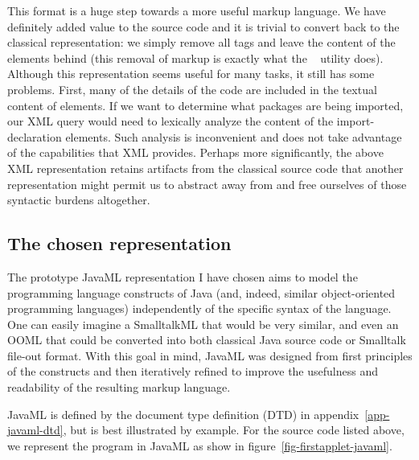 \documentclass{article}
\begin{document}
This format is a huge step towards a more useful markup language.  We
have definitely added value to the source code and it is trivial to
convert back to the classical representation: we simply remove all tags
and leave the content of the elements behind (this removal of markup is
exactly what the ~\cite{perlSGML} utility does).
Although this representation seems useful for many tasks, it still has
some problems.  First, many of the details of the code are included in
the textual content of elements.  If we want to determine what packages
are being imported, our XML query would need to lexically analyze the
content of the import-declaration elements.  Such analysis is
inconvenient and does not take advantage of the capabilities that XML
provides.  Perhaps more significantly, the above XML representation
retains artifacts from the classical source code that another
representation might permit us to abstract away from and free ourselves
of those syntactic burdens altogether.

\subsection{The chosen representation}

The prototype JavaML representation I have chosen aims to model the
programming language constructs of Java (and, indeed, similar
object-oriented programming languages) independently of the specific
syntax of the language.  One can easily imagine a SmalltalkML that would
be very similar, and even an OOML that could be converted into both
classical Java source code or Smalltalk file-out format.  With this goal
in mind, JavaML was designed from first principles of the constructs and
then iteratively refined to improve the usefulness and readability of
the resulting markup language.

JavaML is defined by the document type definition (DTD) in
appendix~\ref{app-javaml-dtd}, but is best illustrated by example.  For the
 source code listed above, we represent the
program in JavaML as show in figure~\ref{fig-firstapplet-javaml}.
\end{document}
